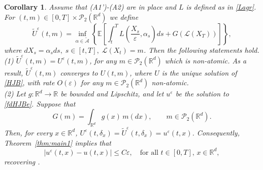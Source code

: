 \documentclass[reqno,11pt]{amsart}
\newtheorem{corollary}[theorem]{Corollary}
\numberwithin{equation}{section}
\newcommand{\be}{\begin{equation}}
\newcommand{\ee}{\end{equation}}
\newcommand{\yh}[1]{{\color{orange}[YH: #1]}}
\newcommand{\zd}[1]{{\color{brown}[ZD:#1]}}
\newcommand{\R}{\mathbb{R}} %
\newcommand{\e}{\varepsilon}
\begin{document}
\begin{corollary}\label{aeequality}
    Assume that (A1')-(A2) are in place and $L$ is defined as in \eqref{Lagr}. For $(t,m)\in [0,T]\times\mathcal{P}_2(\R^d)$ we define
            \be\nonumber
\widetilde{U}^\e(t,m)=\inf_{\alpha\in\widetilde{\mathcal{A}}}\left\{ \mathbb{E}\left[ \int_t^TL\left( \frac{X_s}{\e},\alpha_s\right)ds+G(\mathcal{L}(X_T))   \right]\right\},
            \ee
where $dX_s=\alpha_sds,\;s\in[t,T],\; \mathcal{L}(X_t)=m$.
Then the following statements hold.\\
(1) $\widetilde{U}^\e(t,m)=U^\e(t,m)$, for any $m\in\mathcal{P}_2(\R^d)$ which is non-atomic. As a result, $\widetilde{U}^\e(t,m)$ converges to $U(t,m)$, where $U$ is the unique solution of \eqref{HJB}, with rate $O(\e)$ for any $m\in\mathcal{P}_2(\R^d)$ non-atomic.
\\
(2) Let $g:\R^d\to\R$ be bounded and Lipschitz, and let $u^\e$ be the solution to \eqref{fdHJBe}.
Suppose that
    \[
    G(m)=\int_{\R^d} g(x)\,m(dx),
    \qquad m\in\mathcal{P}_2(\R^d).
    \]
 Then, for every $x\in\R^d$, $U^\e(t,\delta_x)=\widetilde{U}^\e(t,\delta_x)=u^\e(t,x)$.
 Consequently, Theorem~\ref{thm:main1} implies that
 \[
 \left|u^\e(t,x)-u(t,x)\right| \leq C \e, \quad \text{for all } t\in [0,T], \,x \in \R^d,
 \]
 recovering \cite[Theorem 1.1]{TranYu2021}.
\end{corollary}

\end{document}
